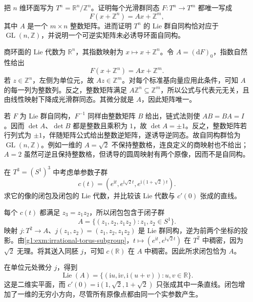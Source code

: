 \begin{exercise}\label{g1:ex:torus-integer-homomorphism}
	把 \(n\) 维环面写为 \(T^n=\mathbb R^n/\mathbb Z^n\)。证明每个光滑群同态 \(F:T^n\to T^m\) 都唯一写成
	\[
		F(x+\mathbb Z^n)=Ax+\mathbb Z^m,
	\]
	其中 \(A\) 是一个 \(m\times n\) 整数矩阵。进而证明 \(T^n\) 的 Lie 群自同构恰对应于 \(\operatorname{GL}(n,\mathbb Z)\)，并说明一个可逆实矩阵未必诱导环面自同构。
\end{exercise}
\begin{solution}
	商环面的 Lie 代数为 \(\mathbb R^n\)，其指数映射为 \(x\mapsto x+\mathbb Z^n\)。令 \(A=(\mathrm{d}F)_0\)，指数自然性给出
	\[
		F(x+\mathbb Z^n)=Ax+\mathbb Z^m.
	\]
	若 \(z\in\mathbb Z^n\)，左侧为单位元，故 \(Az\in\mathbb Z^m\)。对每个标准基向量应用此条件，可知 \(A\) 的每一列为整数列。反之，整数矩阵满足 \(A\mathbb Z^n\subseteq\mathbb Z^m\)，所以公式与代表元无关，且由线性映射下降成光滑群同态。其微分就是 \(A\)，因此矩阵唯一。

	若 \(F\) 为 Lie 群自同构，\(F^{-1}\) 同样由整数矩阵 \(B\) 给出，链式法则使 \(AB=BA=I\)。因而 \(\det A\)、\(\det B\) 都是整数且乘积为 \(1\)，故 \(\det A=\pm1\)。反之，整数矩阵若行列式为 \(\pm1\)，伴随矩阵公式给出整数逆矩阵，遂诱导逆同态。故自同构群恰为 \(\operatorname{GL}(n,\mathbb Z)\)。例如一维的 \(A=\sqrt2\) 不保持整数格，连良定义的商映射也不给出；\(A=2\) 虽然可逆且保持整数格，但诱导的圆周映射有两个原像，因而不是自同构。
\end{solution}

\begin{exercise}\label{g1:ex:three-torus-flow-closure}
	在 \(T^3=(S^1)^3\) 中考虑单参数子群
	\[
		c(t)=(e^{\mathrm{i}t},e^{\mathrm{i}\sqrt2t},e^{\mathrm{i}(1+\sqrt2)t}).
	\]
	求它的像的闭包及闭包的 Lie 代数，并比较该 Lie 代数与 \(c'(0)\) 张成的直线。
\end{exercise}
\begin{solution}
	每个 \(c(t)\) 都满足 \(z_3=z_1z_2\)，所以闭包包含于闭子群
	\[
		A=\{(z_1,z_2,z_1z_2):z_1,z_2\in S^1\}.
	\]
	映射 \(j:T^2\to A\)、\(j(z_1,z_2)=(z_1,z_2,z_1z_2)\) 是 Lie 群同构，逆为前两个坐标的投影。由\cref{g1:exm:irrational-torus-subgroup}，\(t\mapsto(e^{\mathrm{i}t},e^{\mathrm{i}\sqrt2t})\) 在 \(T^2\) 中稠密，因为 \(\sqrt2\) 无理。将其送入同胚 \(j\)，可知 \(c(\mathbb R)\) 在 \(A\) 中稠密。因此所求闭包恰为 \(A\)。

	在单位元处微分 \(j\)，得到
	\[
		\operatorname{Lie}(A)=\{(\mathrm{i}u,\mathrm{i}v,\mathrm{i}(u+v)):u,v\in\mathbb R\}.
	\]
	这是二维实平面，而 \(c'(0)=\mathrm{i}(1,\sqrt2,1+\sqrt2)\) 只张成其中一条直线。闭包增加了一维的无穷小方向，尽管所有原像点都由同一个实参数产生。
\end{solution}

